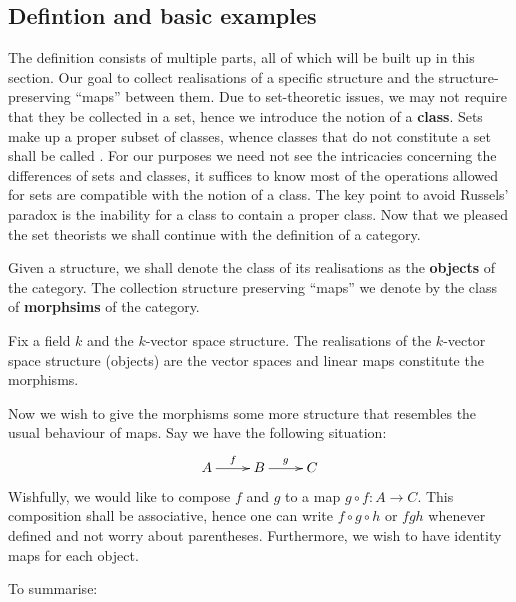 \documentclass[twoside = false,	%
		headsepline,		%
		parskip = true,
		]{scrbook}						%
\begin{document}
    \subsection{Defintion and basic examples}
    The definition consists of multiple parts, all of which will be built up in this section.
    Our goal to collect realisations of a specific structure and the structure-preserving ``maps'' between them.
    Due to set-theoretic issues, we may not require that they be collected in a set,
    hence we introduce the notion of a \textbf{class}. Sets make up a proper subset of classes,
    whence classes that do not constitute a set shall be called .
    For our purposes we need not see the intricacies concerning the differences of sets and classes,
    it suffices to know most of the operations allowed for sets are compatible with the notion of a class.
    The key point to avoid Russels' paradox is the inability for a class to contain a proper class.
    Now that we pleased the set theorists we shall continue with the definition of a category.
    
    Given a structure, we shall denote the class of its realisations as the \textbf{objects} of the category.
    The collection structure preserving ``maps'' we denote by the class of \textbf{morphsims} of the category.

    \begin{example*}{}
        Fix a field $k$ and the $k$-vector space structure.
        The realisations of the $k$-vector space structure (objects) are the vector spaces and
        linear maps constitute the morphisms.
    \end{example*}

    Now we wish to give the morphisms some more structure that resembles the usual behaviour of maps.
    Say we have the following situation:
    \begin{equation*}
        \xymatrix {
            A \ar[r]^{f} & B \ar[r]^g & C
        }
    \end{equation*}
    Wishfully, we would like to compose $f$ and $g$ to a map $g \circ f: A \to C$.
    This composition shall be associative, hence one can write $f \circ g \circ h$ or $fgh$ whenever defined and not worry about parentheses. Furthermore, we wish to have identity maps for each object.
    
    To summarise:
\end{document}
